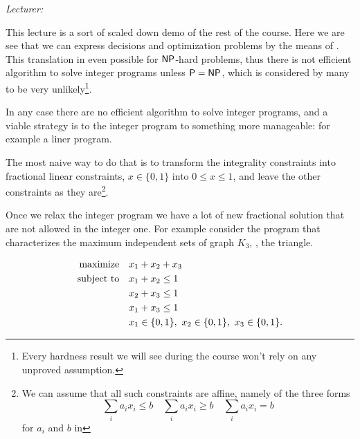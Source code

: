 \documentclass[a4paper,twoside,justified]{tufte-handout}
\begin{document}
 
\maketitle
\thispagestyle{fancy}
\begin{marginfigure}
  \emph{Lecturer: \DataLecturer}
\end{marginfigure}

\begin{abstract}
  \emph{\DataAbstract}
\end{abstract}


This lecture is a sort of scaled down demo of the rest of the
course. Here we are see that we can express decisions and optimization
problems by the means of . This translation in
even possible for $ \mathsf{NP} $-hard problems, thus there is not efficient
algorithm to solve integer programs unless $\mathsf{P}=\mathsf{NP}$, which is
considered by many to be very unlikely\footnote{Every hardness result
  we will see during the course won't rely on any unproved assumption.}.

In any case there are no  efficient algorithm to
solve integer programs, and a viable strategy is to
 the integer program to something more
manageable: for example a liner program.

The most naive way to do that is to transform the integrality
constraints into fractional linear constraints, \eg $ x \in\{0,1\} $
into $ 0 \leq x \leq 1 $, and leave the other constraints as they
are\footnote{We can assume that all such constraints are affine,
  namely of the three forms
  \begin{equation*}
    \sum_{i}a_{i}x_{i} \leq b \quad   \sum_{i}a_{i}x_{i} \geq b \quad \sum_{i}a_{i}x_{i} = b
  \end{equation*}
  for $a_i$ and $ b $ in \RR}.

Once we relax the integer program we have a lot of new fractional
solution that are not allowed in the integer one. For example consider
the program that characterizes the maximum independent sets of graph $
K_{3} $, \ie, the triangle.

\begin{alignat}{2}
  \maximize x_{1} + x_{2} + x_{3} \notag\\
  \subjectto   x_{1} + x_{2} \leq 1 \notag\\
             & x_{2} + x_{3} \leq 1 \label{eq:triangle-ind-set}\\
             & x_{1} + x_{3} \leq 1 \notag\\
             & \varboolean{x_{1}},\ \varboolean{x_{2}},\ \varboolean{x_{3}}.\notag
\end{alignat}
\end{document}
